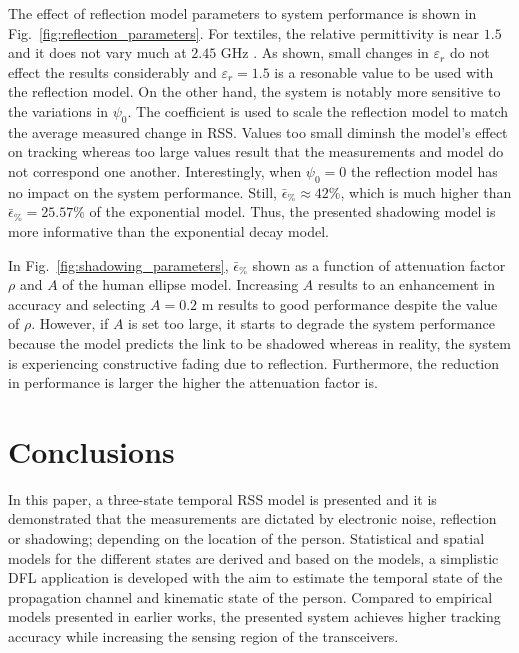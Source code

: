 \documentclass[journal, 10pt, twocolumn, balance]{IEEEtran}
\begin{document}
The effect of reflection model parameters to system performance is shown in Fig.~\ref{fig:reflection_parameters}. For textiles, the relative permittivity is near $1.5$ and it does not vary much at $2.45 \text{ GHz}$ \cite{Sankaralingam2010}. As shown, small changes in $\varepsilon_r$ do not effect the results considerably and $\varepsilon_r = 1.5$ is a resonable value to be used with the reflection model. On the other hand, the system is notably more sensitive to the variations in $\psi_0$. The coefficient is used to scale the reflection model to match the average measured change in RSS. Values too small diminsh the model's effect on tracking whereas too large values result that the measurements and model do not correspond one another. Interestingly, when $\psi_0=0$ the reflection model has no impact on the system performance. Still, $\bar{\epsilon}_\% \approx 42 \%$, which is much higher than $\bar{\epsilon}_\% = 25.57 \%$ of the exponential model. Thus, the presented shadowing model is more informative than the exponential decay model.

In Fig.~\ref{fig:shadowing_parameters}, $\bar{\epsilon}_\%$ shown as a function of attenuation factor $\rho$ and $A$ of the human ellipse model. Increasing $A$ results to an enhancement in accuracy and selecting $A = 0.2 \text{ m}$ results to good performance despite the value of $\rho$. However, if $A$ is set too large, it starts to degrade the system performance because the model predicts the link to be shadowed whereas in reality, the system is experiencing constructive fading due to reflection. Furthermore, the reduction in performance is larger the higher the attenuation factor is.





\section{Conclusions} \label{S:conlcusions}
In this paper, a three-state temporal RSS model is presented and it is demonstrated that the measurements are dictated by electronic noise, reflection or shadowing; depending on the location of the person. Statistical and spatial models for the different states are derived and based on the models, a simplistic DFL application is developed with the aim to estimate the temporal state of the propagation channel and kinematic state of the person. Compared to empirical models presented in earlier works, the presented system achieves higher tracking accuracy while increasing the sensing region of the transceivers.
\end{document}

